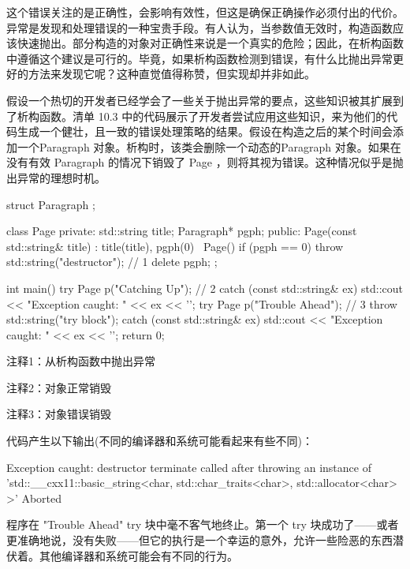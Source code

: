 这个错误关注的是正确性，会影响有效性，但这是确保正确操作必须付出的代价。异常是发现和处理错误的一种宝贵手段。有人认为，当参数值无效时，构造函数应该快速抛出。部分构造的对象对正确性来说是一个真实的危险；因此，在析构函数中遵循这个建议是可行的。毕竟，如果析构函数检测到错误，有什么比抛出异常更好的方法来发现它呢？这种直觉值得称赞，但实现却并非如此。


假设一个热切的开发者已经学会了一些关于抛出异常的要点，这些知识被其扩展到了析构函数。清单 10.3 中的代码展示了开发者尝试应用这些知识，来为他们的代码生成一个健壮，且一致的错误处理策略的结果。假设在构造之后的某个时间会添加一个Paragraph 对象。析构时，该类会删除一个动态的Paragraph 对象。如果在没有有效 Paragraph 的情况下销毁了 Page ，则将其视为错误。这种情况似乎是抛出异常的理想时机。


\begin{cpp}
struct Paragraph {};

class Page {
private:
  std::string title;
  Paragraph* pgph;
public:
  Page(const std::string& title) : title(title), pgph(0) {}
  ~Page() {
    if (pgph == 0)
      throw std::string("destructor"); // 1
    delete pgph;
  }
};

int main() {
  try {
    Page p("Catching Up"); // 2
  } catch (const std::string& ex) {
    std::cout << "Exception caught: " << ex << '\n';
  }
  try {
    Page p("Trouble Ahead"); // 3
    throw std::string("try block");
  } catch (const std::string& ex) {
    std::cout << "Exception caught: " << ex << '\n';
  }
  return 0;
}
\end{cpp}

{\footnotesize
注释1：从析构函数中抛出异常

注释2：对象正常销毁

注释3：对象错误销毁
}

代码产生以下输出(不同的编译器和系统可能看起来有些不同)：

\begin{shell}
Exception caught: destructor terminate called after throwing an instance of 'std::__cxx11::basic_string<char, std::char_traits<char>, std::allocator<char> >'
Aborted
\end{shell}

程序在 "Trouble Ahead" try 块中毫不客气地终止。第一个 try 块成功了——或者更准确地说，没有失败——但它的执行是一个幸运的意外，允许一些险恶的东西潜伏着。其他编译器和系统可能会有不同的行为。


